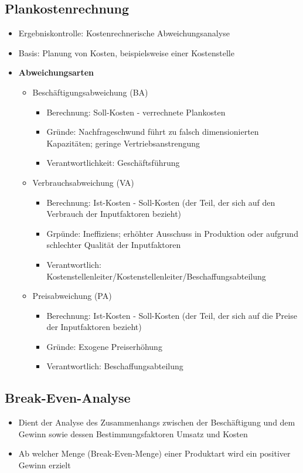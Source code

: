 \subsection{Plankostenrechnung}
\begin{itemize}
	\item Ergebniskontrolle: Kostenrechnerische Abweichungsanalyse
	\item Basis: Planung von Kosten, beispielsweise einer Kostenstelle
	\item \textbf{Abweichungsarten}
	\begin{itemize}
		\item Beschäftigungsabweichung (BA)
		\begin{itemize}
			\item Berechnung: Soll-Kosten - verrechnete Plankosten
			\item Gründe: Nachfrageschwund führt zu falsch dimensionierten Kapazitäten; geringe Vertriebsanstrengung
			\item Verantwortlichkeit: Geschäftsführung
		\end{itemize}
		\item Verbrauchsabweichung (VA)
		\begin{itemize}
			\item Berechnung: Ist-Kosten - Soll-Kosten (der Teil, der sich auf den Verbrauch der Inputfaktoren bezieht)
			\item Grpünde: Ineffiziens; erhöhter Ausschuss in Produktion oder aufgrund schlechter Qualität der Inputfaktoren
			\item Verantwortlich: Kostenstellenleiter/Kostenstellenleiter/Beschaffungsabteilung
		\end{itemize}
		\item Preisabweichung (PA)
		\begin{itemize}
			\item Berechnung: Ist-Kosten - Soll-Kosten (der Teil, der sich auf die Preise der Inputfaktoren bezieht)
			\item Gründe: Exogene Preiserhöhung
			\item Verantwortlich: Beschaffungsabteilung
		\end{itemize}
	\end{itemize}
\end{itemize}


\subsection{Break-Even-Analyse}
\begin{itemize}
	\item Dient der Analyse des Zusammenhangs zwischen der Beschäftigung und dem Gewinn sowie dessen Bestimmungsfaktoren Umsatz und Kosten
	\item Ab welcher Menge (Break-Even-Menge) einer Produktart wird ein positiver Gewinn erzielt
\end{itemize}



